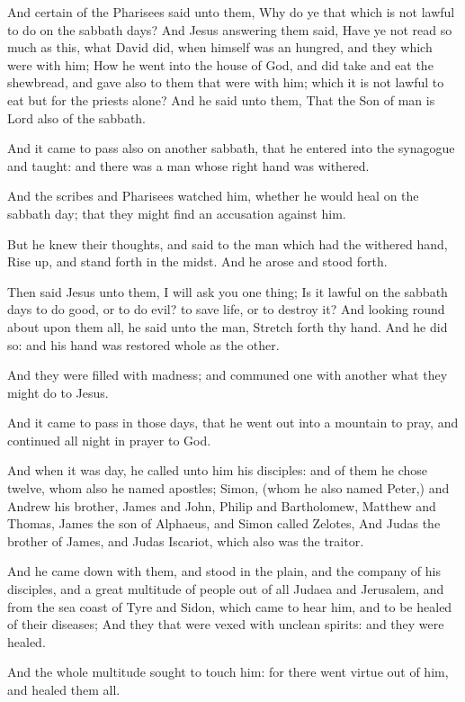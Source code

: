 \verse And certain of the Pharisees said unto them, Why do ye that which is not lawful to do on the sabbath days?  \verse And Jesus answering them said, Have ye not read so much as this, what David did, when himself was an hungred, and they which were with him; \verse How he went into the house of God, and did take and eat the shewbread, and gave also to them that were with him; which it is not lawful to eat but for the priests alone?  \verse And he said unto them, That the Son of man is Lord also of the sabbath.

\verse And it came to pass also on another sabbath, that he entered into the synagogue and taught: and there was a man whose right hand was withered.

\verse And the scribes and Pharisees watched him, whether he would heal on the sabbath day; that they might find an accusation against him.

\verse But he knew their thoughts, and said to the man which had the withered hand, Rise up, and stand forth in the midst. And he arose and stood forth.

\verse Then said Jesus unto them, I will ask you one thing; Is it lawful on the sabbath days to do good, or to do evil? to save life, or to destroy it?  \verse And looking round about upon them all, he said unto the man, Stretch forth thy hand. And he did so: and his hand was restored whole as the other.

\verse And they were filled with madness; and communed one with another what they might do to Jesus.

\verse And it came to pass in those days, that he went out into a mountain to pray, and continued all night in prayer to God.

\verse And when it was day, he called unto him his disciples: and of them he chose twelve, whom also he named apostles; \verse Simon, (whom he also named Peter,) and Andrew his brother, James and John, Philip and Bartholomew, \verse Matthew and Thomas, James the son of Alphaeus, and Simon called Zelotes, \verse And Judas the brother of James, and Judas Iscariot, which also was the traitor.

\verse And he came down with them, and stood in the plain, and the company of his disciples, and a great multitude of people out of all Judaea and Jerusalem, and from the sea coast of Tyre and Sidon, which came to hear him, and to be healed of their diseases; \verse And they that were vexed with unclean spirits: and they were healed.

\verse And the whole multitude sought to touch him: for there went virtue out of him, and healed them all.

